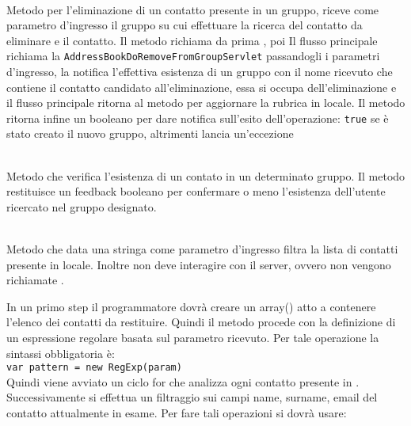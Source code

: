\begin{description}
	\item{}\\
	Metodo per l'eliminazione di un contatto presente in un gruppo, riceve come parametro d'ingresso il gruppo su cui effettuare la ricerca del contatto da eliminare e il contatto. 
Il metodo richiama da prima , poi Il flusso principale richiama la  \texttt{AddressBookDoRemoveFromGroupServlet} passandogli i parametri d'ingresso, la  notifica l'effettiva esistenza di un gruppo con il nome ricevuto che contiene il contatto candidato all'eliminazione, essa si occupa dell'eliminazione e il flusso principale ritorna al metodo  per aggiornare la rubrica in locale. Il metodo ritorna infine un  booleano per dare notifica sull'esito dell'operazione: \texttt{true} se è stato creato il nuovo gruppo, altrimenti lancia un'eccezione
	
	\item{}\\
Metodo che verifica l'esistenza di un contato in un determinato gruppo. Il metodo restituisce un feedback booleano per confermare o meno l'esistenza dell'utente ricercato nel gruppo designato.

\item{}\\
Metodo che data una stringa come parametro d'ingresso filtra la lista di contatti presente in locale. Inoltre non deve interagire con il server, ovvero non vengono richiamate .

In un primo step il programmatore dovrà creare un array() atto a contenere l'elenco dei contatti da restituire. Quindi il metodo procede con la definizione di un espressione regolare basata sul parametro ricevuto. Per tale operazione la sintassi obbligatoria è:\\

\verb|var pattern = new RegExp(param)|\\

Quindi viene avviato un ciclo for che analizza ogni contatto presente in . Successivamente si effettua un filtraggio sui campi name, surname, email del contatto attualmente in esame. Per fare tali operazioni si dovrà usare:\\


\end{description}
